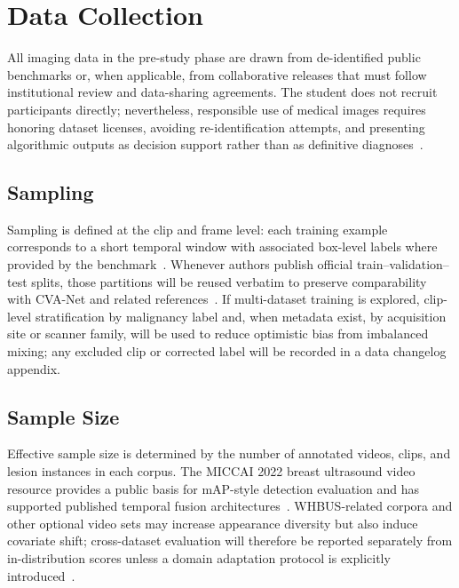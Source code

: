 \documentclass[
english,                 %
bibtex,                  %
]{kththesis}
\numberwithin{listing}{chapter}
\begin{document}
\section{Data Collection}
\label{sec:dataCollection}

All imaging data in the pre-study phase are drawn from de-identified public benchmarks or, when applicable, from collaborative releases that must follow institutional review and data-sharing agreements.
The student does not recruit participants directly; nevertheless, responsible use of medical images requires honoring dataset licenses, avoiding re-identification attempts, and presenting algorithmic outputs as decision support rather than as definitive diagnoses~\cite{dan2024_breast_us_dl_review,wang2021_ultrasound_dl_review}.

\subsection{Sampling}

Sampling is defined at the clip and frame level: each training example corresponds to a short temporal window with associated box-level labels where provided by the benchmark~\cite{lin2022_buv_miccai}.
Whenever authors publish official train--validation--test splits, those partitions will be reused verbatim to preserve comparability with CVA-Net and related references~\cite{lin2022_buv_miccai}.
If multi-dataset training is explored, clip-level stratification by malignancy label and, when metadata exist, by acquisition site or scanner family, will be used to reduce optimistic bias from imbalanced mixing; any excluded clip or corrected label will be recorded in a data changelog appendix.

\subsection{Sample Size}

Effective sample size is determined by the number of annotated videos, clips, and lesion instances in each corpus.
The MICCAI 2022 breast ultrasound video resource provides a public basis for mAP-style detection evaluation and has supported published temporal fusion architectures~\cite{lin2022_buv_miccai}.
WHBUS-related corpora and other optional video sets may increase appearance diversity but also induce covariate shift; cross-dataset evaluation will therefore be reported separately from in-distribution scores unless a domain adaptation protocol is explicitly introduced~\cite{zhang2024_whbus_isbi,dan2024_breast_us_dl_review}.
\end{document}
